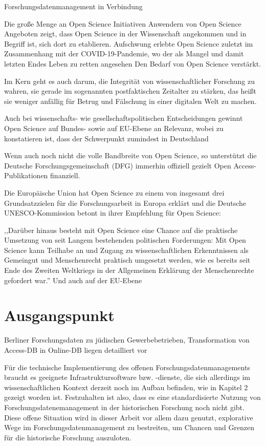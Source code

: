 \onehalfspacing

Forschungsdatenmanagement in Verbindung

Die große Menge an Open Science Initiativen Anwendern von Open Science Angeboten zeigt, dass Open Science in der Wissenschaft angekommen und in Begriff ist, sich dort zu etablieren. 
Aufschwung erlebte Open Science zuletzt im Zusammenhang mit der COVID-19-Pandemie, wo der als Mangel und damit letzten Endes Leben zu retten angesehen Den Bedarf von Open Science verstärkt. 



 Im Kern geht es auch darum, die Integrität von wissenschaftlicher Forschung zu wahren, sie gerade im sogenannten postfaktischen Zeitalter zu stärken, das heißt sie weniger anfällig für Betrug und Fälschung in einer digitalen Welt zu machen. 
  

 

Auch bei wissenschafts- wie gesellschaftspolitischen Entscheidungen gewinnt Open Science auf Bundes- sowie auf EU-Ebene an Relevanz, wobei zu konstatieren ist, dass der Schwerpunkt zumindest in Deutschland 


Wenn auch noch nicht die volle Bandbreite von Open Science, so unterstützt die Deutsche Forschungsgemeinschaft (DFG) immerhin offiziell gezielt Open Access-Publikationen finanziell. 

Die Europäische Union hat Open Science zu einem von insgesamt drei Grundsatzzielen für die Forschungsarbeit in Europa erklärt  und die  Deutsche UNESCO-Kommission betont in ihrer Empfehlung für Open Science:

,,Darüber hinaus besteht mit Open Science eine Chance auf die praktische Umsetzung von seit Langem bestehenden politischen Forderungen: Mit Open Science kann Teilhabe an und Zugang zu wissenschaftlichen Erkenntnissen als Gemeingut und Menschenrecht praktisch umgesetzt werden, wie es bereits seit Ende des Zweiten Weltkriegs in der Allgemeinen Erklärung der Menschenrechte gefordert war.''
Und auch auf der EU-Ebene 

\section{Ausgangspunkt}

Berliner Forschungsdaten zu jüdischen Gewerbebetrieben, Transformation von Access-DB in Online-DB
liegen detailliert vor

Für die technische Implementierung des offenen Forschungsdatenmanagements braucht es geeignete Infrastruktursoftware bzw. -dienste, die sich allerdings im wissenschaftlichen Kontext derzeit noch im Aufbau befinden, wie in Kapitel 2 gezeigt worden ist. Festzuhalten ist also, dass es eine standardisierte Nutzung von Forschungsdatenemanagement in der historischen Forschung noch nicht gibt. Diese offene Situation wird in dieser Arbeit vor allem dazu genutzt, explorative Wege im Forschungsdatenmanagement zu bestreiten, um Chancen und Grenzen für die historische Forschung auszuloten.

